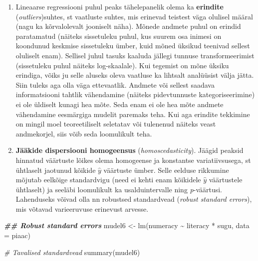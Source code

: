 \documentclass[
]{book}
\newenvironment{Shaded}{\begin{snugshade}}{\end{snugshade}}
\newcommand{\AttributeTok}[1]{\textcolor[rgb]{0.77,0.63,0.00}{#1}}
\newcommand{\CommentTok}[1]{\textcolor[rgb]{0.56,0.35,0.01}{\textit{#1}}}
\newcommand{\DocumentationTok}[1]{\textcolor[rgb]{0.56,0.35,0.01}{\textbf{\textit{#1}}}}
\newcommand{\FunctionTok}[1]{\textcolor[rgb]{0.00,0.00,0.00}{#1}}
\newcommand{\NormalTok}[1]{#1}
\newcommand{\OtherTok}[1]{\textcolor[rgb]{0.56,0.35,0.01}{#1}}
\newcommand{\SpecialCharTok}[1]{\textcolor[rgb]{0.00,0.00,0.00}{#1}}
\begin{document}
\begin{enumerate}
\def\labelenumi{\arabic{enumi}.}
\setcounter{enumi}{1}
\item
  Lineaarse regressiooni puhul peaks tähelepanelik olema ka \textbf{erindite} (\emph{outliers})suhtes, st vaatluste suhtes, mis erinevad teistest väga olulisel määral (nagu ka kõrvalolevalt jooniselt näha). Mõnede andmete puhul on erindid paratamatud (näiteks sissetuleku puhul, kus suurem osa inimesi on koondunud keskmise sissetuleku ümber, kuid mõned üksikud teenivad sellest oluliselt enam). Sellisel juhul tasuks kaaluda jällegi tunnuse transformeerimist (sissetuleku puhul näiteks log-skaalale). Kui tegemist on mõne üksiku erindiga, võiks ju selle aluseks oleva vaatluse ka lihtsalt analüüsist välja jätta. Siin tuleks aga olla väga ettevaatlik. Andmete või sellest saadava informatsiooni tahtlik vähendamine (näiteks pidevtunnuste kategoriseerimine) ei ole üldiselt kunagi hea mõte. Seda enam ei ole hea mõte andmete vähendamine eesmärgiga mudelit paremaks teha. Kui aga erindite tekkimine on mingil moel teoreetiliselt seletatav või tulenenud näiteks veast andmekorjel, siis võib seda loomulikult teha.
\item
  \textbf{Jääkide dispersiooni homogeensus} (\emph{homoscedasticity}). Jäägid peaksid hinnatud väärtuste lõikes olema homogeense ja konstantse variatiivsusega, st ühtlaselt jaotunud kõikide \(\hat{y}\) väärtuste ümber. Selle eelduse rikkumine mõjutab eelkõige standardvigu (need ei kehti enam kõikidele \(\hat{y}\) väärtustele ühtlaselt) ja seeläbi loomulikult ka usalduintervalle ning \emph{p}-väärtusi. Lahenduseks võivad olla nn robustsed standardvead (\emph{robust standard errors}), mis võtavad varieeruvuse erinevust arvesse.
\end{enumerate}

\begin{Shaded}
\begin{Highlighting}[]
\DocumentationTok{\#\# Robust standard errors}
\NormalTok{mudel6 }\OtherTok{\textless{}{-}} \FunctionTok{lm}\NormalTok{(numeracy }\SpecialCharTok{\textasciitilde{}}\NormalTok{ literacy }\SpecialCharTok{*}\NormalTok{ sugu, }
             \AttributeTok{data =}\NormalTok{ piaac)}

\CommentTok{\# Tavalised standardvead}
\FunctionTok{summary}\NormalTok{(mudel6)}
\end{Highlighting}
\end{Shaded}
\end{document}
